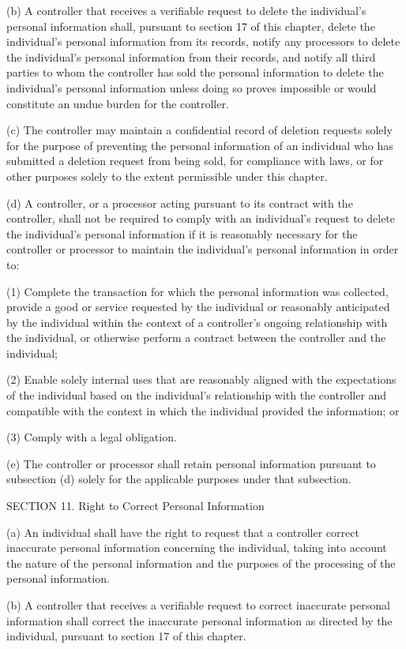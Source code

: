 (b) A controller that receives a verifiable request to delete the individual’s personal information shall, pursuant to section 17 of this chapter, delete the individual’s personal information from its records, notify any processors to delete the individual’s personal information from their records, and notify all third parties to whom the controller has sold the personal information to delete the individual’s personal information unless doing so proves impossible or would constitute an undue burden for the controller.

(c) The controller may maintain a confidential record of deletion requests solely for the purpose of preventing the personal information of an individual who has submitted a deletion request from being sold, for compliance with laws, or for other purposes solely to the extent permissible under this chapter.

(d) A controller, or a processor acting pursuant to its contract with the controller, shall not be required to comply with an individual’s request to delete the individual’s personal information if it is reasonably necessary for the controller or processor to maintain the individual’s personal information in order to:

(1) Complete the transaction for which the personal information was collected, provide a good or service requested by the individual or reasonably anticipated by the individual within the context of a controller’s ongoing relationship with the individual, or otherwise perform a contract between the controller and the individual;

(2) Enable solely internal uses that are reasonably aligned with the expectations of the individual based on the individual’s relationship with the controller and compatible with the context in which the individual provided the information; or

(3) Comply with a legal obligation.

(e) The controller or processor shall retain personal information pursuant to subsection (d) solely for the applicable purposes under that subsection.

SECTION 11. Right to Correct Personal Information

(a) An individual shall have the right to request that a controller correct inaccurate personal information concerning the individual, taking into account the nature of the personal information and the purposes of the processing of the personal information.

(b) A controller that receives a verifiable request to correct inaccurate personal information shall correct the inaccurate personal information as directed by the individual, pursuant to section 17 of this chapter.

